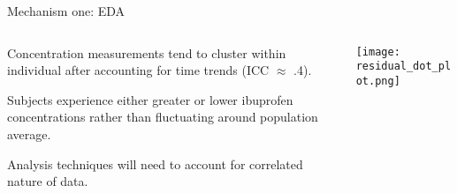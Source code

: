 \documentclass[handout]{beamer}
\begin{document}
\begin{frame}{Mechanism one: EDA}
\begin{columns}
\begin{column}{.4\textwidth}
\small
Concentration measurements tend to cluster within individual after accounting for time trends (ICC $\approx$ .4). 

\bigskip

Subjects experience either greater or lower ibuprofen concentrations rather than fluctuating around population average.

\bigskip

Analysis techniques will need to account for correlated nature of data.

\end{column}
\begin{column}{.6\textwidth}
\texttt{[image: residual\_dot\_plot.png]}
\end{column}
\end{columns}

\end{frame}
\end{document}
